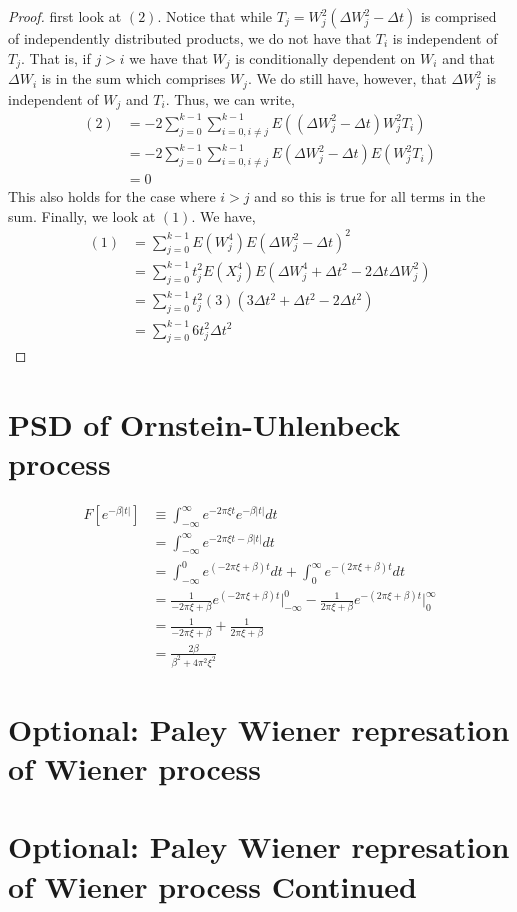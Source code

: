 \documentclass{article}
\begin{document}
\begin{proof}
        first look at $(2)$. Notice that while $T_j = W_j^2(\Delta W_j^2 - \Delta t)$
        is comprised of independently distributed products, we do not have that
        $T_i$ is independent of $T_j$. That is, if $j > i$ we have that $W_j$ is
        conditionally dependent on $W_i$ and that $\Delta W_i$ is in the sum
        which comprises $W_j$. We do still have, however, that $\Delta W_j^2$ is
        independent of $W_j$ and $T_i$. Thus, we can write, 
        \begin{align*}
            (2) &= -2\sum_{j=0}^{k-1}\sum_{i=0,i\ne j}^{k-1} E\left((\Delta W_j^2
            - \Delta t)W_j^2 T_i\right)
            \\
            &= -2\sum_{j=0}^{k-1}\sum_{i=0,i\ne j}^{k-1} E(\Delta W_j^2
            - \Delta t)E(W_j^2 T_i)
            \\
            &= 0
        \end{align*}
        This also holds for the case where $i > j$ and so this is true for all
        terms in the sum. Finally, we look at $(1)$. We have, 
        \begin{align*}
            (1) &= \sum_{j=0}^{k-1} E(W_j^4)E(\Delta W_j^2 - \Delta t)^2
            \\
            &= \sum_{j=0}^{k-1} t_j^2E(X_j^4)E(\Delta W_j^4 + \Delta t^2 -
            2\Delta t\Delta W_j^2)
            \\
            &= \sum_{j=0}^{k-1} t_j^2(3)\left(3\Delta t^2 + \Delta t^2 - 2\Delta
            t^2\right)
            \\
            &= \sum_{j=0}^{k-1} 6t_j^2\Delta t^2
        \end{align*}
    \end{proof}
\section{PSD of Ornstein-Uhlenbeck process}
    \begin{align*}
        F\left[e^{-\beta|t|}\right] &\equiv \int_{-\infty}^{\infty} e^{-2\pi\xi
        t}e^{-\beta|t|}dt 
        \\
        &= \int_{-\infty}^{\infty} e^{-2\pi\xi
        t -\beta|t|}dt 
        \\
        &= \int_{-\infty}^{0} e^{(-2\pi\xi + \beta 
        )t }dt + \int_{0}^{\infty} e^{-(2\pi\xi +
        \beta) t}dt
        \\
        &= \frac{1}{-2\pi\xi + \beta}e^{(-2\pi\xi + \beta)t}\Big|_{-\infty}^0 - 
        \frac{1}{2\pi\xi + \beta}e^{-(2\pi\xi + \beta)t}\Big|_0^{\infty}
        \\
        &= \frac{1}{-2\pi\xi + \beta} + \frac{1}{2\pi\xi + \beta}
        \\
        &= \frac{2\beta}{\beta^2 + 4\pi^2\xi^2}
    \end{align*}

\section{Optional: Paley Wiener represation of Wiener process}

\section{Optional: Paley Wiener represation of Wiener process Continued}
\end{document}
